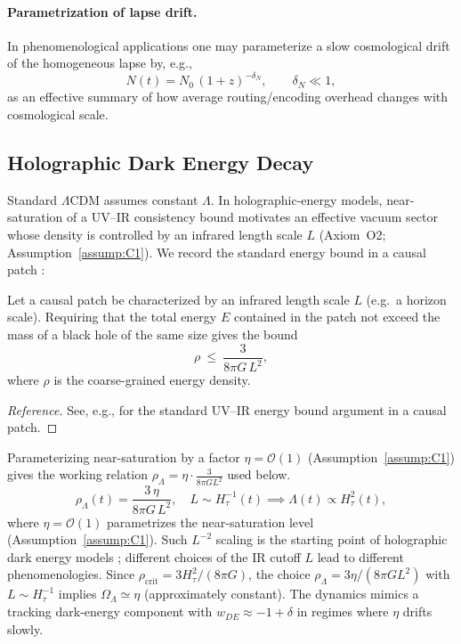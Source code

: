 \paragraph{Parametrization of lapse drift.}
In phenomenological applications one may parameterize a slow cosmological drift of the homogeneous lapse by, e.g.,
\begin{equation}
    N(t)=N_0\,(1+z)^{-\delta_N},\qquad \delta_N\ll 1,
\end{equation}
as an effective summary of how average routing/encoding overhead changes with cosmological scale.

\subsection{Holographic Dark Energy Decay}
Standard $\Lambda$CDM assumes constant $\Lambda$. In holographic-energy models, near-saturation of a UV--IR consistency bound motivates an effective vacuum sector whose density is controlled by an infrared length scale $L$ (Axiom~O2; Assumption~\ref{assump:C1}). We record the standard energy bound in a causal patch \cite{CohenKaplanNelson1999}:
\begin{proposition}
\label{prop:hde_bound}
Let a causal patch be characterized by an infrared length scale $L$ (e.g.\ a horizon scale). Requiring that the total energy $E$ contained in the patch not exceed the mass of a black hole of the same size gives the bound
\begin{equation}
    \rho\ \le\ \frac{3}{8\pi G\,L^2},
\end{equation}
where $\rho$ is the coarse-grained energy density.
\end{proposition}
\begin{proof}[Reference]
See, e.g., \cite{CohenKaplanNelson1999} for the standard UV--IR energy bound argument in a causal patch.
\end{proof}
\noindent
Parameterizing near-saturation by a factor $\eta=\mathcal{O}(1)$ (Assumption~\ref{assump:C1}) gives the working relation $\rho_\Lambda=\eta\cdot \frac{3}{8\pi G L^2}$ used below.
\begin{equation}
    \rho_{\Lambda}(t) = \frac{3 \,\eta}{8\pi G\, L^2}, \quad L \sim H_{\tau}^{-1}(t) \implies \Lambda(t) \propto H_{\tau}^2(t),
\end{equation}
where $\eta=\mathcal{O}(1)$ parametrizes the near-saturation level (Assumption~\ref{assump:C1}). Such $L^{-2}$ scaling is the starting point of holographic dark energy models \cite{Li2004}; different choices of the IR cutoff $L$ lead to different phenomenologies. Since $\rho_{\mathrm{crit}}=3H_\tau^2/(8\pi G)$, the choice $\rho_\Lambda=3\eta/(8\pi G L^2)$ with $L\sim H_\tau^{-1}$ implies $\Omega_\Lambda\simeq \eta$ (approximately constant). The dynamics mimics a tracking dark-energy component with $w_{DE}\approx -1+\delta$ in regimes where $\eta$ drifts slowly.

